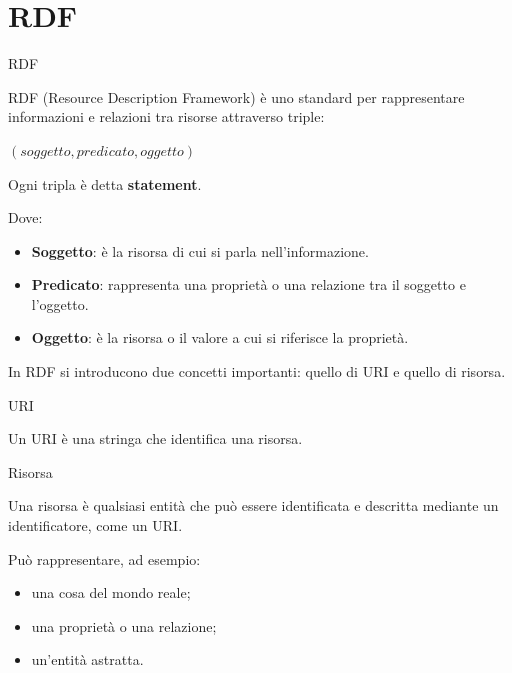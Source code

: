 \chapter{RDF}


\begin{definition}{RDF}

    RDF (Resource Description Framework) è uno standard per rappresentare
    informazioni e relazioni tra risorse attraverso triple:

    \begin{center}
        $(soggetto, predicato, oggetto)$
    \end{center}

    Ogni tripla è detta \textbf{statement}.

\end{definition}

Dove:

\begin{itemize}

    \item \textbf{Soggetto}: è la risorsa di cui si parla
    nell'informazione.

    \item \textbf{Predicato}: rappresenta una proprietà o una relazione
    tra il soggetto e l'oggetto.

    \item \textbf{Oggetto}: è la risorsa o il valore a cui si riferisce
    la proprietà.

\end{itemize}

In RDF si introducono due concetti importanti: quello di URI e quello
di risorsa.

\begin{definition}{URI}

    Un URI è una stringa che identifica una risorsa.

\end{definition}

\begin{definition}{Risorsa}

    Una risorsa è qualsiasi entità che può essere identificata e descritta
    mediante un identificatore, come un URI.

    Può rappresentare, ad esempio:

    \begin{itemize}
        \item una cosa del mondo reale;
        \item una proprietà o una relazione;
        \item un'entità astratta.
    \end{itemize}

\end{definition}

